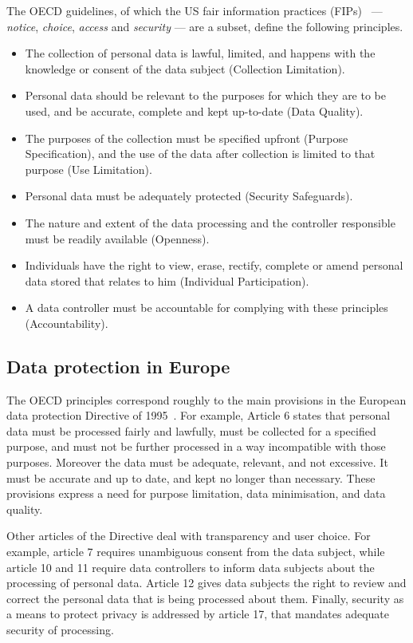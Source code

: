 The OECD guidelines, of which the US fair information practices (FIPs)~\cite{ftc2000fips} --- 
\emph{notice}, \emph{choice}, \emph{access} and \emph{security} ---
are a subset, define the following principles.
\begin{itemize}
\item The collection of personal data is lawful, limited, and happens with
the knowledge or consent of the data subject (Collection Limitation).
\item Personal data should be relevant to the purposes for which they are to
be used, and be accurate, complete and kept up-to-date (Data Quality).
\item The purposes of the collection must be specified upfront  (Purpose Specification), and the use of the data after collection is limited to that purpose (Use Limitation).
\item Personal data must be adequately protected (Security Safeguards).
\item The nature and extent of the data processing and the controller responsible must be readily available (Openness).
\item Individuals have the right to view, erase, rectify, complete or amend personal data stored that relates to him (Individual Participation).
\item A data controller must be accountable for complying with these principles (Accountability).
\end{itemize}


\subsection{Data protection in Europe}

The OECD principles correspond roughly to the main provisions in the European data protection Directive of 1995~\cite{ec-95-46}. For example, Article 6 states that personal data must be
processed fairly and lawfully, must be collected for a specified purpose, and must not be further processed in a way incompatible with those purposes. Moreover the data must be adequate, relevant, and not excessive. It must be accurate and up to date, and kept no longer than necessary. These provisions express a need for purpose limitation, data minimisation, and data quality.

Other articles of the Directive deal with transparency and user choice. For example, article 7 requires unambiguous consent from the data subject, while article 10 and 11 require data controllers to inform data subjects about the processing of personal data. Article 12 gives data subjects the right to review and correct the personal data that is being processed about them. Finally, security as a means to protect privacy is addressed by article 17, that mandates adequate security of processing.

